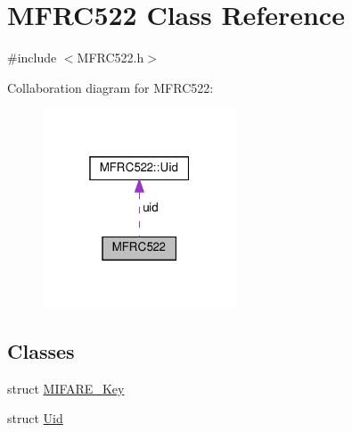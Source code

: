 \hypertarget{class_m_f_r_c522}{}\section{M\+F\+R\+C522 Class Reference}
\label{class_m_f_r_c522}


{\ttfamily \#include $<$M\+F\+R\+C522.\+h$>$}



Collaboration diagram for M\+F\+R\+C522\+:\nopagebreak
\begin{figure}[H]
\begin{center}
\leavevmode
\includegraphics[width=163pt]{class_m_f_r_c522__coll__graph}
\end{center}
\end{figure}
\subsection*{Classes}
\begin{DoxyCompactItemize}
\item 
struct \hyperlink{struct_m_f_r_c522_1_1_m_i_f_a_r_e___key}{M\+I\+F\+A\+R\+E\+\_\+\+Key}
\item 
struct \hyperlink{struct_m_f_r_c522_1_1_uid}{Uid}
\end{DoxyCompactItemize}
